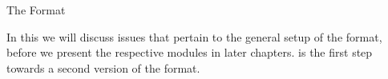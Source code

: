 
\begin{omgroup}[creators=miko,id=spec-intro]{The \omdoc Format}

  In this \currentsectionlevel we will discuss issues that pertain to the general setup of
  the \omdoc format, before we present the respective modules in later
  chapters. {} is the first step towards a second version of the \omdoc
  format.

\end{omgroup}

